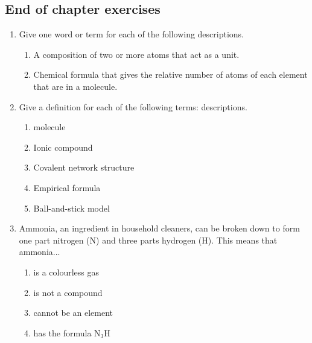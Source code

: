 \label{m38120*secfhsst!!!underscore!!!id497}
            \subsection{ End of chapter exercises}
            \nopagebreak
            \label{m38120*id311490}\begin{enumerate}[noitemsep, label=\textbf{\arabic*}. ] 
            \label{m38120*uid87}\item Give one word or term for each of the following 
descriptions.
\label{m38120*id34411506}\begin{enumerate}[noitemsep, label=\textbf{\alph*}. ] 
            \label{m38120*uid90}\item A composition of two or more atoms that act as a unit.
\label{m38120*uid9221}\item Chemical formula that gives the relative number of atoms 
of each element that are in a molecule.
\end{enumerate}
                
\label{m38120*uid227}\item Give a definition for each of the following terms: 
descriptions.
\label{m38120*id311506}\begin{enumerate}[noitemsep, label=\textbf{\alph*}. ] 
            \label{m38120*uid930}\item molecule
\label{m38120*uid91}\item Ionic compound
\item Covalent network structure\item Empirical formula\item Ball-and-stick model\end{enumerate}
                
\label{m38120*uid92}\item Ammonia, an ingredient in household cleaners, can be broken down to 
form one part nitrogen (\begin{math}\mathrm{N}\end{math}) and three parts hydrogen (\begin{math}\mathrm{H}\end{math}). This means that 
ammonia...
\label{m38120*id311590}\begin{enumerate}[noitemsep, label=\textbf{\alph*}. ] 
            \label{m38120*uid94}\item is a 
colourless gas
\label{m38120*uid95}\item is not a compound
\label{m38120*uid96}\item cannot be an element
\label{m38120*uid97}\item has the formula \begin{math}{\mathrm{N}}_{3}\mathrm{H}\end{math}
\end{enumerate}
        

\end{enumerate}

